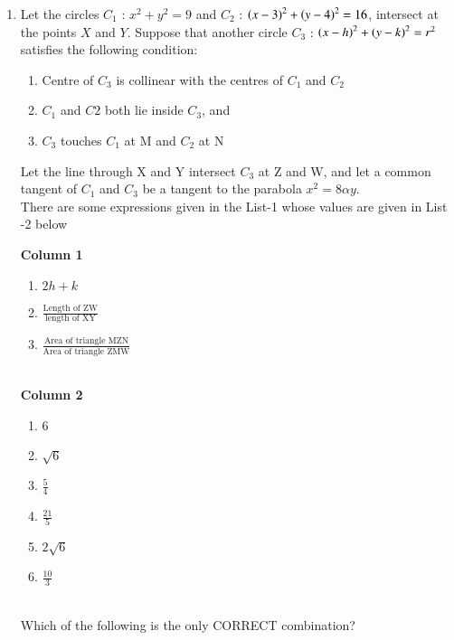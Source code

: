 \documentclass[journal,12pt,twocolumn]{IEEEtran}
\theoremstyle{remark}
\begin{document}
\begin{enumerate}
\item Let the circles $C_{1}$ : $x^2+y^2=9$ and $C_{2}$ : $\left(x-3\right)^2+\left(y-4\right)^2 = 16$, intersect at the points $X$ and $Y$. Suppose that another circle $C_{3}$ : $\left(x-h\right)^2+\left(y-k\right)^2=r^2$ satisfies the following condition:\\
 
 
 \begin{enumerate}[label=(\roman*)]
 \item Centre of $C_{3}$ is collinear with the centres of $C_{1}$ and $C_{2}$
 \item $C_{1}$ and $C{2}$ both lie inside $C_{3}$, and

 \item $C_{3}$ touches $C_{1}$ at M and $C_{2}$ at N
\end{enumerate}
Let the line through X and Y intersect $C_{3}$ at Z and W, and let a common tangent of $C_{1}$ and $C_{3}$ be a tangent to the parabola $x^2=8\alpha y.$\\

There are some expressions given in the List-1 whose values are given in List -2 below
			

\textbf{Column 1}
\begin{enumerate}[label=(\Alph*)]           
\item $2h+k$                                  
\item $\frac{\text{Length of ZW}}{\text{length of XY}}$     
\item $\frac{\text{Area of triangle MZN}}{\text{Area of triangle ZMW}}$                     
\end{enumerate}\\
 \textbf{Column 2}
 \begin{enumerate}[label=(\alph*) , start=16]
 \item 6
 \item $\sqrt{6}$
 \item $\frac{5}{4}$                           
 \item $\frac{21}{5}$                          
 \item $2\sqrt{6}$                             
 \item $\frac{10}{3}$                         
 \end{enumerate}\\
 Which of the following is the only CORRECT combination?                                    
\begin{enumerate}[label=(\alph*)]  


\end{enumerate}
\end{enumerate}
\end{document}
